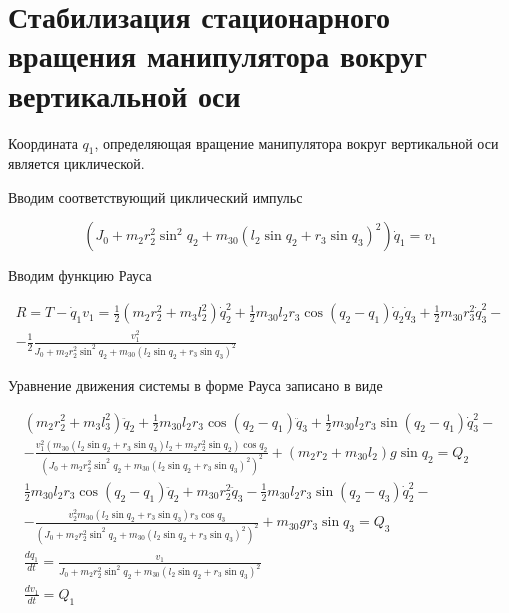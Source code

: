   \section{Стабилизация стационарного вращения манипулятора вокруг вертикальной оси}%
  
  Координата $q_1$, определяющая вращение манипулятора вокруг вертикальной оси является циклической.
  
  Вводим соответствующий циклический импульс
  
  \begin{equation*}
  (J_0 + m_2 r_2^2 \sin^2 q_2 + m_{30} (l_2 \sin q_2 + r_3 \sin q_3)^2) \dot q_1 = v_1
  \end{equation*} 
  
  Вводим функцию Рауса
  
  \begin{equation*}
  \begin{array}{c}
  \displaystyle R = T - \dot q_1 v_1 = \frac12 (m_2 r_2^2 + m_3 l_2^2) \dot q_2^2
  + \frac12 m_{30} l_2 r_3 \cos(q_2 - q_1) \dot q_2 \dot q_3 + \frac12 m_{30} r_3^2 \dot q_3^2 - \\ \displaystyle - \frac12 \frac{v_1^2}{J_0 + m_2 r_2^2 \sin^2 q_2 + m_{30} (l_2 \sin q_2 + r_3 \sin q_3)^2}
  \end{array}
  \end{equation*}
  
  Уравнение движения системы в форме Рауса записано в виде
  
  \begin{equation*}
  \begin{array}{l}
  \displaystyle (m_2 r_2^2 + m_3 l_3^2) \ddot q_2 + \frac12 m_{30} l_2 r_3 \cos(q_2 - q_1) \ddot q_3 + \frac12 m_{30} l_2 r_3 \sin(q_2 - q_1) \dot q_3^2 - \\ 
  \displaystyle - \frac{v_1^2 (m_{30} (l_2 \sin q_2 + r_3 \sin q_3) l_2 + m_2 r_2^2 \sin q_2) \cos q_2}{(J_0 + m_2 r_2^2 \sin^2 q_2 + m_{30} (l_2 \sin q_2 + r_3 \sin q_3)^2)^2} + (m_2 r_2 + m_{30} l_2) g \sin q_2 = Q_2 \\
  \displaystyle \frac12 m_{30} l_2 r_3 \cos (q_2 - q_1) \ddot q_2 + m_{30} r_2^2 \ddot q_3 - \frac12 m_{30} l_2 r_3 \sin(q_2 - q_3) \dot q_2^2 - \\ 
  \displaystyle - \frac{v_2^2 m_{30} (l_2 \sin q_2 + r_3 \sin q_3) r_3 \cos q_3}{(J_0 + m_2 r_2^2 \sin^2 q_2 + m_{30} (l_2 \sin q_2 + r_3 \sin q_3)^2)^2} + m_{30} g r_3 \sin q_3 = Q_3 \\
  \displaystyle \frac{d q_1}{d t} = \frac{v_1}{J_0 + m_2 r_2^2 \sin^2 q_2 + m_{30} (l_2 \sin q_2 + r_3 \sin q_3)^2} \\
  \displaystyle \frac{d v_1}{d t} = Q_1
  \end{array}
  \end{equation*}
  
